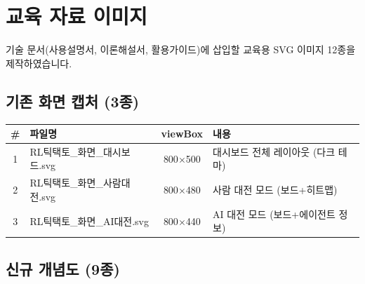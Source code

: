 \documentclass[11pt,a4paper]{article}
\begin{document}
\section{교육 자료 이미지}

기술 문서(사용설명서, 이론해설서, 활용가이드)에 삽입할 교육용 SVG 이미지 12종을 제작하였습니다.

\subsection{기존 화면 캡처 (3종)}

\begin{center}
\renewcommand{\arraystretch}{1.3}
\small
\begin{tabular}{|c|l|c|p{4.5cm}|}
\hline
\rowcolor{tableheader}
\textbf{\#} & \textbf{파일명} & \textbf{viewBox} & \textbf{내용} \\
\hline
1 & RL틱택토\_화면\_대시보드.svg & 800$\times$500 & 대시보드 전체 레이아웃 (다크 테마) \\
\hline
2 & RL틱택토\_화면\_사람대전.svg & 800$\times$480 & 사람 대전 모드 (보드+히트맵) \\
\hline
3 & RL틱택토\_화면\_AI대전.svg & 800$\times$440 & AI 대전 모드 (보드+에이전트 정보) \\
\hline
\end{tabular}
\end{center}

\subsection{신규 개념도 (9종)}
\end{document}
